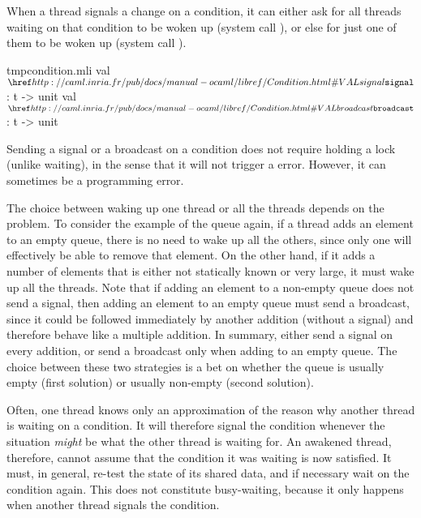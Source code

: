 When a thread signals a change on a condition, it can either ask for
all threads waiting on that condition to be woken up
(system call ), or else for just one of them to be
woken up (system call ).
%
\begin{listingcodefile}{tmpcondition.mli}
val $\libvalue{Condition}{signal}$ : t -> unit
val $\libvalue{Condition}{broadcast}$ : t -> unit
\end{listingcodefile}
%
Sending a signal or a broadcast on a condition does not require
holding a lock (unlike waiting), in the sense that it will not trigger
a  error.
However, it can sometimes be a programming error.

The choice between waking up one thread or all the threads depends on
the problem.  To consider the example of the queue again, if a thread
adds an element to an empty queue, there is no need to wake up all the
others, since only one will effectively be able to remove that
element.  On the other hand, if it adds a number of elements that is
either not statically known or very large, it must wake up all the
threads.  Note that if adding an element to a non-empty queue does not
send a signal, then adding an element to an empty queue must send a
broadcast, since it could be followed immediately by another addition
(without a signal) and therefore behave like a multiple addition.
In summary, either send a signal on every addition, or send a
broadcast only when adding to an empty queue.
The choice between these two strategies is a bet on whether the queue
is usually empty (first solution) or usually non-empty (second
solution).

Often, one thread knows only an approximation of the reason why
another thread is waiting on a condition.  It will therefore signal
the condition whenever the situation \emph{might} be what the other
thread is waiting for.  An awakened thread, therefore, cannot assume
that the condition it was waiting is now satisfied.  It must, in
general, re-test the state of its shared data, and if necessary wait
on the condition again.  This does not constitute busy-waiting, because
it only happens when another thread signals the condition.

